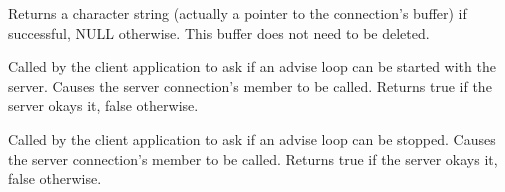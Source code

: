 Returns a character string (actually a pointer to the
connection's buffer) if successful, NULL otherwise. This buffer
does not need to be deleted.

\label{wxconnectionstartadvise}


Called by the client application to ask if an advise loop can be
started with the server. Causes the server connection's 
\rtfsp
member to be called. Returns true if the server okays it, false
otherwise.

\label{wxconnectionstopadvise}


Called by the client application to ask if an advise loop can be
stopped. Causes the server connection's  
member to be called. Returns true if the server okays it, false
otherwise.

